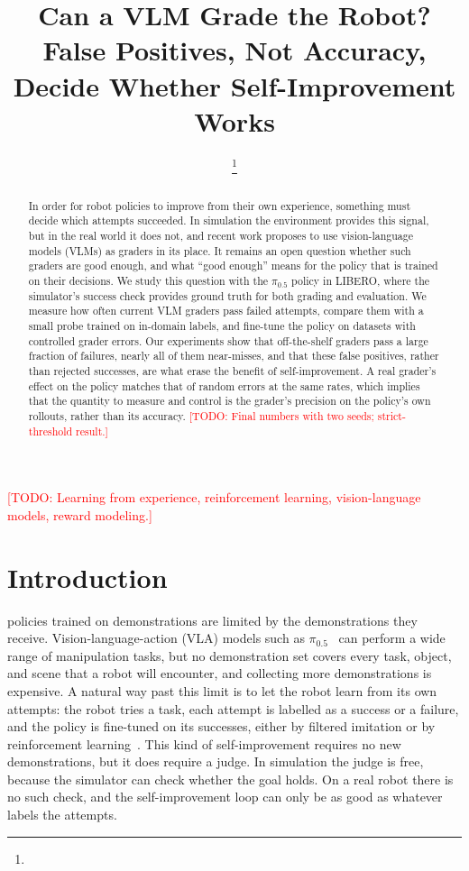 \documentclass[letterpaper, journal, twoside]{IEEEtran}
\title{Can a VLM Grade the Robot?\\ False Positives, Not Accuracy, Decide Whether Self-Improvement Works}
\author{\todo{Authors}%
\thanks{\todo{Affiliation, Georgia Institute of Technology.}}}
\newcommand{\todo}[1]{\textcolor{red}{[TODO: #1]}}
\newcommand{\pizerofive}{$\pi_{0.5}$}
\begin{document}
\maketitle

\begin{abstract}
In order for robot policies to improve from their own experience, something must decide which attempts succeeded.
In simulation the environment provides this signal, but in the real world it does not, and recent work proposes to
use vision-language models (VLMs) as graders in its place. It remains an open question whether such graders are good
enough, and what ``good enough'' means for the policy that is trained on their decisions. We study this question with
the \pizerofive{} policy in LIBERO, where the simulator's success check provides ground truth for both grading and
evaluation. We measure how often current VLM graders pass failed attempts, compare them with a small probe trained on
in-domain labels, and fine-tune the policy on datasets with controlled grader errors. Our experiments show that
off-the-shelf graders pass a large fraction of failures, nearly all of them near-misses, and that these false positives,
rather than rejected successes, are what erase the benefit of self-improvement. A real grader's effect on the policy
matches that of random errors at the same rates, which implies that the quantity to measure and control is the
grader's precision on the policy's own rollouts, rather than its accuracy. \todo{Final numbers with two seeds; strict-threshold result.}
\end{abstract}

\begin{IEEEkeywords}
\todo{Learning from experience, reinforcement learning, vision-language models, reward modeling.}
\end{IEEEkeywords}

\section{Introduction}

 policies trained on demonstrations are limited by the demonstrations they receive.
Vision-language-action (VLA) models such as \pizerofive{}~\cite{pi05} can perform a wide range of manipulation tasks,
but no demonstration set covers every task, object, and scene that a robot will encounter, and collecting more
demonstrations is expensive. A natural way past this limit is to let the robot learn from its own attempts: the robot
tries a task, each attempt is labelled as a success or a failure, and the policy is fine-tuned on its successes, either
by filtered imitation or by reinforcement learning~\cite{sefm,pistar06,simplevlarl}. This kind of self-improvement
requires no new demonstrations, but it does require a judge. In simulation the judge is free, because the simulator can
check whether the goal holds. On a real robot there is no such check, and the self-improvement loop can only be as good
as whatever labels the attempts.
\end{document}
